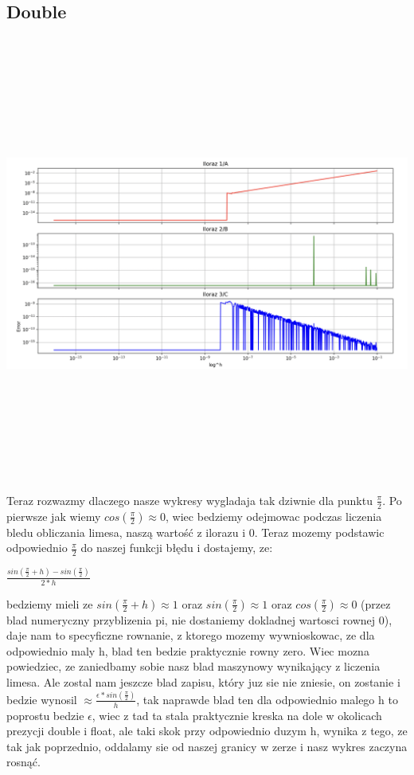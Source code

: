 \documentclass[12pt]{article}
\begin{document}
\subsection*{Double}
\includegraphics[width=15cm,height=15cm, keepaspectratio]{wykres_double_pi}
Teraz rozwazmy dlaczego nasze wykresy wygladaja tak dziwnie dla punktu $\frac{\pi}{2}$. 
Po pierwsze jak wiemy $cos(\frac{\pi}{2}) \approx 0$, wiec bedziemy odejmowac podczas liczenia bledu obliczania limesa, naszą wartość z ilorazu i 0. Teraz mozemy podstawic odpowiednio $\frac{\pi}{2}$ do naszej funkcji błędu i dostajemy, ze:
\newline
\newline
\begin{center}
    $\frac{sin(\frac{\pi}{2} + h) - sin(\frac{\pi}{2})}{2*h}$
    \newline
    \newline
\end{center}
bedziemy mieli ze $sin(\frac{\pi}{2} + h) \approx 1$ oraz $sin(\frac{\pi}{2}) \approx 1$ oraz $cos(\frac{\pi}{2}) \approx 0$ (przez blad numeryczny przyblizenia pi, nie dostaniemy dokladnej wartosci rownej 0), daje nam to specyficzne rownanie, z ktorego mozemy wywnioskowac, ze dla odpowiednio maly h, blad ten bedzie praktycznie rowny zero. Wiec mozna powiedziec, ze zaniedbamy sobie nasz blad maszynowy wynikający z liczenia limesa. Ale zostal nam jeszcze blad zapisu, który juz sie nie zniesie, on zostanie i bedzie wynosil $\approx \frac{\epsilon*sin(\frac{\pi}{2})}{h}$, tak naprawde blad ten dla odpowiednio malego h to poprostu bedzie $\epsilon$, wiec z tad ta stala praktycznie kreska na dole w okolicach prezycji double i float, ale taki skok przy odpowiednio duzym h, wynika z tego, ze tak jak poprzednio, oddalamy sie od naszej granicy w zerze i nasz wykres zaczyna rosnąć.
\end{document}
